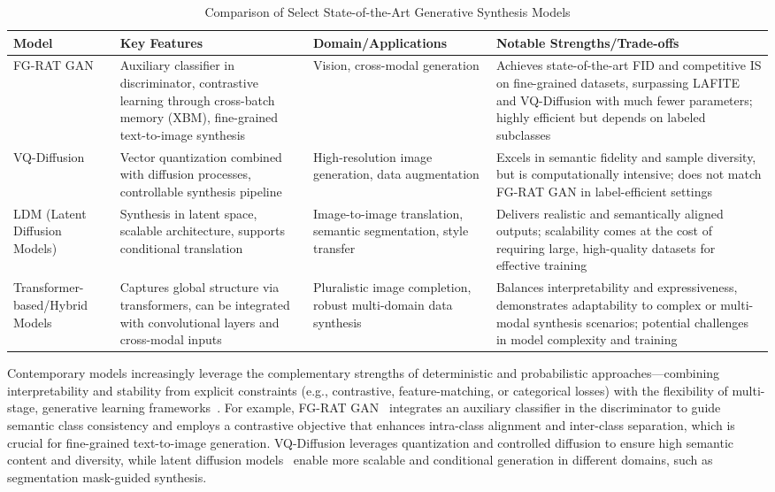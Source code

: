 \documentclass[sigconf]{acmart}
\begin{document}
\begin{table*}[htbp]
\centering
\caption{Comparison of Select State-of-the-Art Generative Synthesis Models}
\label{tab:sota_models}
\begin{adjustbox}{max width=\textwidth}
\begin{tabular}{@{}llll@{}}
\toprule
\textbf{Model} & \textbf{Key Features} & \textbf{Domain/Applications} & \textbf{Notable Strengths/Trade-offs} \\
\midrule
FG-RAT GAN~\cite{ref87} & Auxiliary classifier in discriminator, contrastive learning through cross-batch memory (XBM), fine-grained text-to-image synthesis & Vision, cross-modal generation & Achieves state-of-the-art FID and competitive IS on fine-grained datasets, surpassing LAFITE and VQ-Diffusion with much fewer parameters; highly efficient but depends on labeled subclasses~\cite{ref101} \\
VQ-Diffusion~\cite{ref82,ref87} & Vector quantization combined with diffusion processes, controllable synthesis pipeline & High-resolution image generation, data augmentation & Excels in semantic fidelity and sample diversity, but is computationally intensive; does not match FG-RAT GAN in label-efficient settings \\
LDM (Latent Diffusion Models)~\cite{ref82,ref101} & Synthesis in latent space, scalable architecture, supports conditional translation & Image-to-image translation, semantic segmentation, style transfer & Delivers realistic and semantically aligned outputs; scalability comes at the cost of requiring large, high-quality datasets for effective training \\
Transformer-based/Hybrid Models~\cite{ref64,ref81,ref102} & Captures global structure via transformers, can be integrated with convolutional layers and cross-modal inputs & Pluralistic image completion, robust multi-domain data synthesis & Balances interpretability and expressiveness, demonstrates adaptability to complex or multi-modal synthesis scenarios; potential challenges in model complexity and training \\
\bottomrule
\end{tabular}
\end{adjustbox}
\end{table*}

Contemporary models increasingly leverage the complementary strengths of deterministic and probabilistic approaches—combining interpretability and stability from explicit constraints (e.g., contrastive, feature-matching, or categorical losses) with the flexibility of multi-stage, generative learning frameworks~\cite{ref87,ref90,ref101,ref102}. For example, FG-RAT GAN~\cite{ref101} integrates an auxiliary classifier in the discriminator to guide semantic class consistency and employs a contrastive objective that enhances intra-class alignment and inter-class separation, which is crucial for fine-grained text-to-image generation. VQ-Diffusion leverages quantization and controlled diffusion to ensure high semantic content and diversity, while latent diffusion models~\cite{ref82,ref101,ref102} enable more scalable and conditional generation in different domains, such as segmentation mask-guided synthesis.
\end{document}
